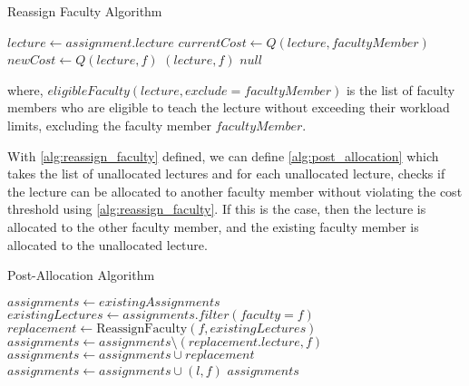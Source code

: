 \begin{algorithm}[H]
  \caption{Reassign Faculty Algorithm}
  \begin{algorithmic}[1]
    \State $lecture \gets assignment.lecture$
    \State $currentCost \gets Q(lecture, facultyMember)$
    \State $newCost \gets Q(lecture, f)$
    \Return $(lecture, f)$
    \EndIf
    \EndFor
    \EndFor
    \State \Return $null$
    \EndProcedure
  \end{algorithmic}
  \label{alg:reassign_faculty}
\end{algorithm}

where, $eligibleFaculty(lecture, exclude=facultyMember)$ is the list of faculty members who are eligible to teach the lecture without exceeding their workload limits, excluding the faculty member $facultyMember$.

With \autoref{alg:reassign_faculty} defined, we can define \autoref{alg:post_allocation} which takes the list of unallocated lectures and for each unallocated lecture, checks if the lecture can be allocated to another faculty member without violating the cost threshold using \autoref{alg:reassign_faculty}. If this is the case, then the lecture is allocated to the other faculty member, and the existing faculty member is allocated to the unallocated lecture.

\begin{algorithm}[H]
  \caption{Post-Allocation Algorithm}
  \begin{algorithmic}[1]
    \State $assignments \gets existingAssignments$
    \State $existingLectures \gets assignments.filter(faculty=f)$
    \State $replacement \gets \text{ReassignFaculty}(f, existingLectures)$
    \State $assignments \gets assignments \setminus (replacement.lecture, f)$
    \State $assignments \gets assignments \cup replacement$
    \State $assignments \gets assignments \cup (l, f)$
    \EndIf
    \EndFor
    \EndFor
    \State \Return $assignments$
    \EndProcedure
  \end{algorithmic}
  \label{alg:post_allocation}
\end{algorithm}

